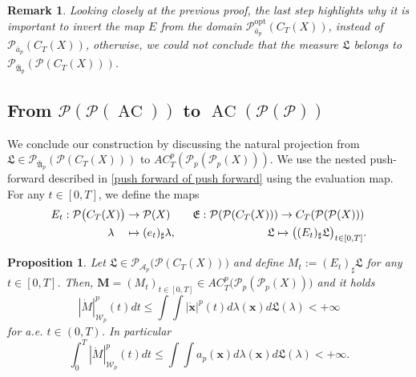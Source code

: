 \documentclass[10pt,leqno]{amsart}
\numberwithin{equation}{section}
\newtheorem{prop}[teorema]{Proposition}
\newtheorem{oss}[teorema]{Remark}
\newcommand{\PP}{\mathcal{P}}
\begin{document}
\begin{oss}
    Looking closely at the previous proof, the last step highlights why it is important to invert the map $E$ from the domain $\PP^{\operatorname{opt}}_{\bar{a}_p}(C_T(X))$, instead of $\PP_{\bar{a}_p}(C_T(X))$, otherwise, we could not conclude that the measure $\mathfrak{L}$ belongs to $\PP_{\bar{\mathfrak{A}}_p}(\PP(C_T(X)))$. %
\end{oss}


















\subsection{From \texorpdfstring{$\PP(\PP(\operatorname{AC}))$}{} to \texorpdfstring{$\operatorname{AC}(\PP(\PP))$}{}}\label{section from P(P(AC) to AC(P(P)) metric}
We conclude our construction by discussing the natural projection from $\mathfrak{L}\in \PP_{\overline{\mathfrak{A}}_p}(\PP(C_T(X)))$ to $AC_T^p(\PP_p(\PP_p(X)))$. We use the nested push-forward described in \eqref{push forward of push forward} using the evaluation map. For any $t \in [0,T]$, we define the maps 
\begin{equation}\label{eq: ppac to acpp}
    \begin{aligned}
        E_t: \PP\big(C_T(X)\big) & \to \PP(X) \qquad \mathfrak{E}: \PP(\PP(C_T(X))) \to C_T(\PP(\PP(X)))
        \\
        \lambda \quad & \mapsto (e_t)_\sharp \lambda, \hspace{2.85cm} \mathfrak{L}  \mapsto \big((E_t)_\sharp \mathfrak{L}\big)_{t\in[0,T]}. 
    \end{aligned}
\end{equation}

\begin{prop}\label{well def from L to M}
    Let $\mathfrak{L}\in \PP_{\mathcal{A}_p}\big(\PP(C_T(X))\big)$ and define $M_t:= (E_t)_\sharp \mathfrak{L}$ for any $t\in [0,T]$. Then, $\boldsymbol{M}= (M_t)_{t\in [0,T]} \in AC^p_T\big(\PP_p(\PP_p(X))\big)$ and it holds
    \begin{equation}
         |\dot{M}|_{\mathcal{W}_p}^p(t) dt \leq \int\int |\dot{\boldsymbol{x}}|^p(t) d\lambda(\boldsymbol{x}) d\mathfrak{L}(\lambda) <+\infty
    \end{equation}
    for a.e. $t\in (0,T)$. In particular
    \begin{equation}
        \int_0^T |\dot{M}|_{\mathcal{W}_p}^p(t) dt \leq \int\int a_p(\boldsymbol{x}) d\lambda(\boldsymbol{x}) d\mathfrak{L}(\lambda) <+\infty.
    \end{equation}
\end{prop}
\end{document}
